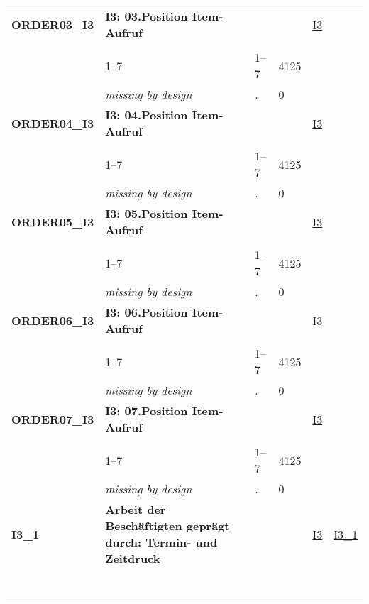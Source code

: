 \begin{longtable}{| L{2.45cm} | L{6cm} | C{1.5cm} | R{1cm} | C{2.25cm} | C{2.25cm} |}
   \midrule
\textbf{ORDER03\_I3}\label{var:ORDER03:I3} & \textbf{I3: 03.Position Item-Aufruf} &  &  & \hyperref[I3]{I3} & \hyperref[var:suf:]{} \\ 
   &  &  &  &  &  \\ 
   & 1--7 & 1--7 & 4125 &  &  \\ 
   & \textit{missing by design} & \textit{.} & 0 &  &  \\ 
   \midrule
\textbf{ORDER04\_I3}\label{var:ORDER04:I3} & \textbf{I3: 04.Position Item-Aufruf} &  &  & \hyperref[I3]{I3} & \hyperref[var:suf:]{} \\ 
   &  &  &  &  &  \\ 
   & 1--7 & 1--7 & 4125 &  &  \\ 
   & \textit{missing by design} & \textit{.} & 0 &  &  \\ 
   \midrule
\textbf{ORDER05\_I3}\label{var:ORDER05:I3} & \textbf{I3: 05.Position Item-Aufruf} &  &  & \hyperref[I3]{I3} & \hyperref[var:suf:]{} \\ 
   &  &  &  &  &  \\ 
   & 1--7 & 1--7 & 4125 &  &  \\ 
   & \textit{missing by design} & \textit{.} & 0 &  &  \\ 
   \midrule
\textbf{ORDER06\_I3}\label{var:ORDER06:I3} & \textbf{I3: 06.Position Item-Aufruf} &  &  & \hyperref[I3]{I3} & \hyperref[var:suf:]{} \\ 
   &  &  &  &  &  \\ 
   & 1--7 & 1--7 & 4125 &  &  \\ 
   & \textit{missing by design} & \textit{.} & 0 &  &  \\ 
   \midrule
\textbf{ORDER07\_I3}\label{var:ORDER07:I3} & \textbf{I3: 07.Position Item-Aufruf} &  &  & \hyperref[I3]{I3} & \hyperref[var:suf:]{} \\ 
   &  &  &  &  &  \\ 
   & 1--7 & 1--7 & 4125 &  &  \\ 
   & \textit{missing by design} & \textit{.} & 0 &  &  \\ 
   \midrule
\textbf{I3\_1}\label{var:I3:1} & \textbf{Arbeit der Beschäftigten geprägt durch: Termin- und Zeitdruck} &  &  & \hyperref[I3]{I3} & \hyperref[var:suf:I3:1]{I3\_1} \\ 
   & \protect\subsection[Variablen I3\_1 bis I1]{} &  &  &  &  \\ 

\end{longtable}
